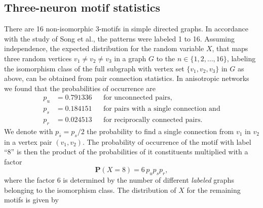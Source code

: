 \subsection{Three-neuron motif statistics}

There are 16 %
non-isomorphic 3-motifs %
in simple directed graphs. In accordance with the study of Song et
al., the patterns were labeled 1 to 16. Assuming independence, the
expected distribution for the random variable $X$, that maps three
random vertices $v_1 \neq v_2 \neq v_3$ in a graph $G$ to the $n \in
\{1,2,\dots,16\}$, labeling the isomorphism class of the full subgraph
with vertex set $\{v_1,v_2,v_3\}$ in $G$ as above, can be obtained
from pair connection statistics. In anisotropic networks we found that
the probabilities of occurrence are
\begin{align*} 
  p_u & = 0.791336     &&\text{for unconnected pairs,}     \\
  p_s & = 0.184151     &&\text{for pairs with a single connection and} \\
  p_r & = 0.024513     &&\text{for reciprocally connected pairs.}
\end{align*}
We denote with $p_{\bar{s}} = p_s/2$ the probability to find a single
connection from $v_1$ in $v_2$ in a vertex pair $(v_1,v_2)$. The
probability of occurrence of the motif with label \enquote{8} is then
the product of the probabilities of it constituents multiplied with a
factor
\[
  \mathbf{P}(X=8) = 6\, p_{u} p_{s} p_{r},
\]
where the factor 6 is determined by the number of different
\textit{labeled} graphs belonging to the isomorphism class. The
distribution of $X$ for the remaining motifs is given by \\
%
\smallskip
%
